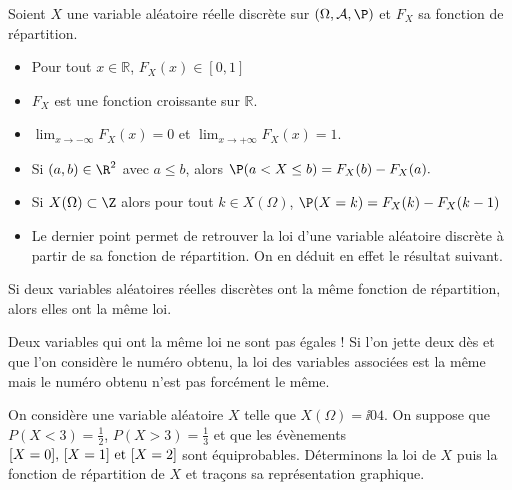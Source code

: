 \documentclass[french,11pt,twoside]{VcCours}
\begin{document}
\begin{Proposition}{}
Soient $X$ une variable aléatoire réelle discrète sur $(\Omega, \mathcal{A}, \P)$ et $F_X$ sa fonction de répartition.
\begin{itemize}
\item Pour tout $ x \in \mathbb{R}$, $F_X(x) \in [0,1]$
\item $F_X$ est une fonction croissante sur $\mathbb{R}$.
\item $\lim_{x\to -\infty} F_X(x) =0$ et $\lim_{x\to +\infty} F_X(x) = 1$.
\item Si $(a,b)\in\R^2$ avec $a\leq b$, alors $\P(a < X \leq b) = F_X(b)-F_X(a).$
\end{itemize}
\end{Proposition}

\begin{Demonstration}{}

\vspace{10cm}
\end{Demonstration}

\begin{Remarques}{}
\begin{itemize}
\item Si $X(\Omega)\subset \Z$ alors pour tout $k \in X(\Omega)$, $\P(X=k)= F_X(k)-F_X(k-1)$
\item Le dernier point permet de retrouver la loi d'une variable aléatoire discrète à partir de sa fonction de répartition. On en déduit en effet le résultat suivant.
\end{itemize}
\end{Remarques}

\begin{Proposition}{}
Si deux variables aléatoires réelles discrètes ont la même fonction de répartition, alors elles ont la même loi.
\end{Proposition}

\begin{Remarque}[\alerte]{} Deux variables qui ont la même loi ne sont pas égales ! Si l'on jette deux dès et que l'on considère le numéro obtenu, la loi des variables associées est la même mais le numéro obtenu n'est pas forcément le même.
\end{Remarque}


\begin{Exemple}{} On considère une variable aléatoire $X$ telle que $X(\Omega) = \ii04$. On suppose que $P(X<3) = \frac{1}{2}$, $P(X>3)= \frac{1}{3}$ et que les évènements $[X=0], \, [X=1] \hbox{ et } [X=2]$ sont équiprobables. Déterminons la loi de $X$ puis la fonction de répartition de $X$ et traçons sa représentation graphique.

\vspace{10cm}
\end{Exemple}
\end{document}
